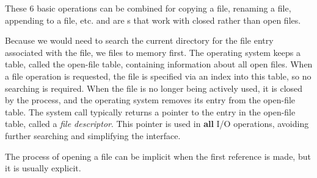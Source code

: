 These 6 basic operations can be combined for copying a file, renaming a file, appending to a file, etc.
 and  are s that work with closed rather than open files.

Because we would need to search the current directory for the file entry associated with the file, we  files to memory first.
The operating system keeps a table, called the open-file table, containing information about all open files.
When a file operation is requested, the file is specified via an index into this table, so no searching is required.
When the file is no longer being actively used, it is closed by the process, and the operating system removes its entry from the open-file table.
The  system call typically returns a pointer to the entry in the open-file table, called a \emph{file descriptor}.
This pointer is used in \textbf{all} I/O operations, avoiding further searching and simplifying the  interface.

\begin{remark*}
  The process of opening a file can be implicit when the first reference is made, but it is usually explicit.
\end{remark*}

